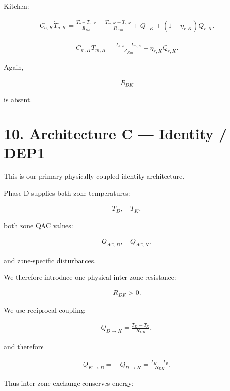\documentclass[11pt]{article}
\begin{document}
Kitchen:

\begin{align}
\boxed{
C_{a,K}\dot T_{a,K}
=
\frac{T_o-T_{a,K}}{R_{Ko}}
+
\frac{T_{m,K}-T_{a,K}}{R_{Km}}
+
Q_{c,K}
+
(1-\eta_{r,K})Q_{r,K}.
}
\tag{24}
\end{align}

\begin{align}
\boxed{
C_{m,K}\dot T_{m,K}
=
\frac{T_{a,K}-T_{m,K}}{R_{Km}}
+
\eta_{r,K}Q_{r,K}.
}
\tag{25}
\end{align}

Again,

\begin{align}
R_{DK}
\end{align}

is absent.

\section*{10. Architecture C --- Identity / DEP1}

This is our primary physically coupled identity architecture.

Phase D supplies both zone temperatures:

\begin{align}
T_D,\quad T_K,
\end{align}

both zone QAC values:

\begin{align}
Q_{AC,D},\quad Q_{AC,K},
\end{align}

and zone-specific disturbances.

We therefore introduce one physical inter-zone resistance:

\begin{align}
\boxed{R_{DK}>0.}
\end{align}

We use reciprocal coupling:

\begin{align}
Q_{D\rightarrow K}
=
\frac{T_D-T_K}{R_{DK}},
\tag{26}
\end{align}

and therefore

\begin{align}
Q_{K\rightarrow D}
=
-\,
Q_{D\rightarrow K}
=
\frac{T_K-T_D}{R_{DK}}.
\tag{27}
\end{align}

Thus inter-zone exchange conserves energy:
\end{document}
